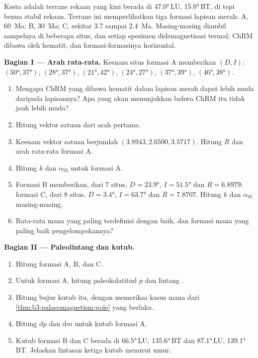 \begin{problem}
\label{pb:b3:palaeomagnetism:1}
Kesta adalah terrane rekaan yang kini berada di \ang{47.0}\,LU, \ang{15.0}\,BT, di tepi
benua stabil rekaan. Terrane ini memperlihatkan tiga formasi lapisan merah: A,
\qty{60}{Ma}; B, \qty{30}{Ma}; C, sekitar 3.7 sampai \qty{2.4}{Ma}. Masing-masing
diambil sampelnya di beberapa situs, dan setiap spesimen didemagnetisasi termal;
ChRM dibawa oleh hematit, dan formasi-formasinya horizontal.

\medskip\noindent\textbf{Bagian I --- Arah rata-rata.} Keenam situs formasi A
memberikan $(D, I)$: $(\ang{50}, \ang{37})$, $(\ang{28}, \ang{37})$,
$(\ang{21}, \ang{42})$, $(\ang{24}, \ang{27})$, $(\ang{37}, \ang{39})$,
$(\ang{46}, \ang{38})$.
\begin{enumerate}
  \item Mengapa ChRM yang dibawa hematit dalam lapisan merah dapat lebih muda
        daripada lapisannya? Apa yang akan menunjukkan bahwa ChRM itu tidak jauh lebih muda?
  \item Hitung vektor satuan dari arah pertama.
  \item Keenam vektor satuan berjumlah $(3.8943, 2.6500, 3.5717)$. Hitung $R$ dan
        arah rata-rata formasi A.
  \item Hitung $k$ dan $\alpha_{95}$ untuk formasi A.
  \item Formasi B memberikan, dari 7 situs, $D = \ang{23.9}$, $I = \ang{51.5}$ dan
        $R = 6.8979$; formasi C, dari 8 situs, $D = \ang{3.4}$, $I =
        \ang{63.7}$ dan $R = 7.8707$. Hitung $k$ dan $\alpha_{95}$ masing-masing.
  \item Rata-rata mana yang paling terdefinisi dengan baik, dan formasi mana yang paling baik pengelompokannya?
\end{enumerate}

\medskip\noindent\textbf{Bagian II --- Paleolintang dan kutub.}
\begin{enumerate}[resume]
  \item Hitung  formasi A, B, dan C.
  \item Untuk formasi A, hitung paleokolatitud $p$ dan lintang
        .
  \item Hitung bujur kutub itu, dengan memeriksa kasus mana dari
        \cref{thm:b3:palaeomagnetism:pole} yang berlaku.
  \item Hitung $\mathrm dp$ dan $\mathrm dm$ untuk kutub formasi A.
  \item Kutub formasi B dan C berada di \ang{66.5}\,LU, \ang{135.6}\,BT dan
        \ang{87.1}\,LU, \ang{139.1}\,BT. Jelaskan lintasan ketiga kutub
        menurut umur.
\end{enumerate}


\end{problem}
